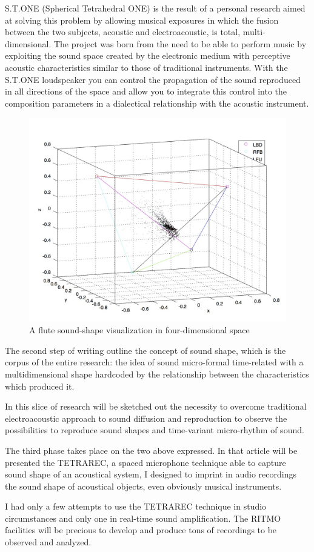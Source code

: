 \documentclass[
	12pt,
	a4paper,
	twocolumn
	]{article}
\begin{document}
S.T.ONE (Spherical Tetrahedral ONE) is the result of a personal research aimed at solving this problem by allowing musical exposures in which the fusion between the two subjects, acoustic and electroacoustic, is total, multi-dimensional. The project was born from the need to be able to perform music by exploiting the sound space created by the electronic medium with perceptive acoustic characteristics similar to those of traditional instruments. With the S.T.ONE loudspeaker you can control the propagation of the sound reproduced in all directions of the space and allow you to integrate this control into the composition parameters in a dialectical relationship with the acoustic instrument.

\begin{figure}[htbp]
\begin{center}
\includegraphics[width=.47\textwidth]{img/13230_1024_2.jpg}
\caption{A flute sound-shape visualization in four-dimensional space}
\label{shape}
\end{center}
\end{figure}

The second step of writing outline the concept of sound shape, which is the corpus of the entire research: the idea of sound micro-formal time-related with a multidimensional shape hardcoded by the relationship between the characteristics which produced it. 

In this slice of research will be sketched out the necessity to overcome traditional electroacoustic approach to sound diffusion and reproduction to observe the possibilities to reproduce sound shapes and time-variant micro-rhythm of sound. 

The third phase takes place on the two above expressed. In that article will be presented the TETRAREC, a spaced microphone technique able to capture sound shape of an acoustical system, I designed to imprint in audio recordings the sound shape of acoustical objects, even obviously musical instruments. 

I had only a few attempts to use the TETRAREC technique in studio circumstances and only one in real-time sound amplification. The RITMO facilities will be precious to develop and produce tons of recordings to be observed and analyzed. 
\end{document}
